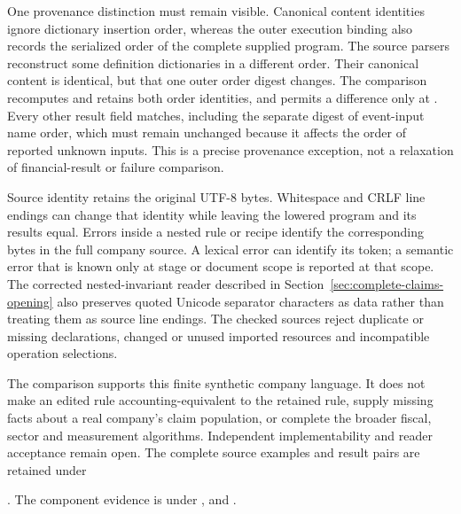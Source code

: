 One provenance distinction must remain visible. Canonical content identities
ignore dictionary insertion order, whereas the outer execution binding also
records the serialized order of the complete supplied program. The source
parsers reconstruct some definition dictionaries in a different order. Their
canonical content is identical, but that one outer order digest changes. The
comparison recomputes and retains both order identities, and permits a
difference only at . Every other result field
matches, including the separate digest of event-input name order, which must
remain unchanged because it affects the order of reported unknown inputs.
This is a precise provenance exception, not a relaxation of financial-result
or failure comparison.

Source identity retains the original UTF-8 bytes. Whitespace and CRLF line
endings can change that identity while leaving the lowered program and its
results equal. Errors inside a nested rule or recipe identify the corresponding
bytes in the full company source. A lexical error can identify its token; a
semantic error that is known only at stage or document scope is reported at
that scope. The corrected nested-invariant reader described in
Section~\ref{sec:complete-claims-opening} also preserves quoted Unicode
separator characters as data rather than treating them as source line endings. The checked sources reject duplicate or missing declarations,
changed or unused imported resources and incompatible operation selections.

The comparison supports this finite synthetic company language. It does not
make an edited rule accounting-equivalent to the retained rule, supply missing
facts about a real company's claim population, or complete the broader fiscal,
sector and measurement algorithms. Independent implementability and reader
acceptance remain open. The complete source examples and result pairs are
retained under
\begingroup\raggedright
{}.
The component evidence is under
,
and .
\par\endgroup

